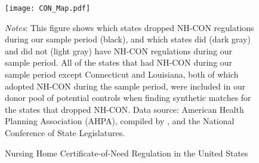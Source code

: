 \documentclass[../Main.tex]{subfiles}
\begin{document}
\newpage
\begin{figure}[t]
	\begin{center}
	\caption{\label{fig:nh_con_map} \centering Nursing Home Certificate-of-Need Regulation in the United States}
    \texttt{[image: CON\_Map.pdf]}
    \end{center}
    \footnotesize
		\textit{Notes}: This figure shows which states dropped NH-CON regulations during our sample period (black), and which states did (dark gray) and did not (light gray) have NH-CON regulations during our sample period. All of the states that had NH-CON during our sample period except Connecticut and Louisiana, both of which adopted NH-CON during the sample period, were included in our donor pool of potential controls when finding synthetic matches for the states that dropped NH-CON. Data source: American Health Planning Association (AHPA), compiled by \citet{stratmann2014certificate}, and the National Conference of State Legislatures.
\end{figure}
\clearpage
\end{document}
